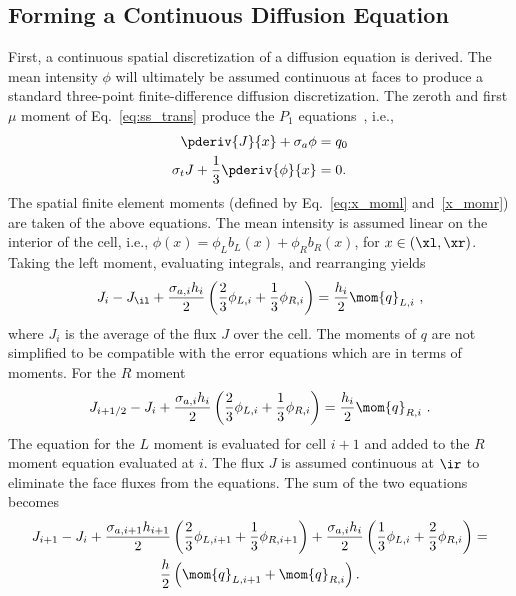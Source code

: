 \subsection{Forming a Continuous Diffusion Equation}

First, a continuous spatial discretization of a diffusion equation is derived.  
The mean intensity $\phi$ will ultimately be assumed continuous at faces to produce a
standard three-point finite-difference diffusion discretization. 
The zeroth and first $\mu$ moment of Eq.~\eqref{eq:ss_trans} produce the $P_1$
equations~\cite{lewis,wla_thesis}, i.e., 
\begin{align}\label{eq:dsa_bal}
    \pderiv{J}{x} + \sigma_a \phi &= q_0 \\ \label{eq:p1}
    \sigma_t J + \frac{1}{3} \pderiv{\phi}{x} &= 0.
\end{align}
The spatial finite element moments (defined by Eq.~\eqref{eq:x_moml} and~\eqref{x_momr})
are taken of the above equations. 
The mean intensity is assumed linear on the interior of the cell, i.e.,
$\phi(x)=\phi_Lb_L(x) + \phi_Rb_R(x)$, for $x\in(\xl,\xr)$.   Taking the left moment,
evaluating integrals, and rearranging yields
\begin{equation}
    J_{i} - J_{\il}  + \frac{\sigma_{a,i}h_i}{2} \left(\frac{2}{3} \phi_{L,i} + \frac{1}{3}
    \phi_{R,i} \right) = \frac{h_i}{2} \mom{q}_{L,i}\,\,,
\end{equation}
where $J_i$ is the average of the flux $J$ over the cell. The moments of $q$ are
not simplified to be compatible with the error equations which are in terms of moments. For the $R$ moment
\begin{equation}
    J_{i+1/2} - J_{i}  + \frac{\sigma_{a,i}h_i}{2} \left(\frac{2}{3} \phi_{L,i} + \frac{1}{3}
    \phi_{R,i} \right) = \frac{h_i}{2} \mom{q}_{R,i}\,\,.
\end{equation}
The equation for the $L$ moment is evaluated for cell $i+1$ and added to the $R$ moment
equation evaluated at $i$.  The flux $J$ is assumed continuous at $\ir$ to eliminate
the face fluxes from the equations.  The sum of the two equations becomes
\begin{multline}\label{eq:diff_noclose}
    J_{i+1} - J_{i} + \frac{\sigma_{a,i+1} h_{i+1}}{2}\left(\frac{2}{3} \phi_{L,i+1} +
    \frac{1}{3}\phi_{R,i+1}\right) + \frac{\sigma_{a,i} h_i}{2} \left( \frac{1}{3} \phi_{L,i} +
    \frac{2}{3}\phi_{R,i}\right) =\\ \frac{h}{2} \left(\mom{q}_{L,i+1} + \mom{q}_{R,i}
    \right).
\end{multline}
